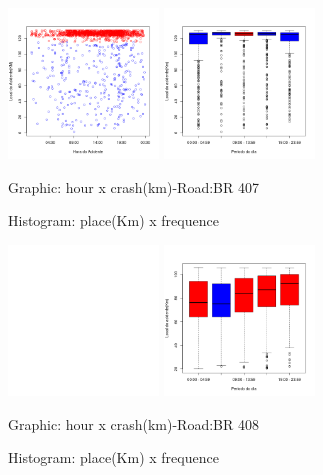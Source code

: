 \documentclass[conference,compsoc]{IEEEtran}
\begin{document}
\begin{figure}[ht]
\begin{center}
     \includegraphics[height=4.0cm]{graficos/br407_1.png}
     \includegraphics[height=4.0cm]{graficos/br407_2.png}
      \caption{Graphic: hour x crash(km)-Road:BR 407}
      \caption{Histogram: place(Km) x frequence}
\end{center}
\end{figure}

\begin{figure}[ht]
\begin{center}
     \includegraphics[height=4.0cm]{graficos/br408_1.png}
     \includegraphics[height=4.0cm]{graficos/br408_2.png}
      \caption{Graphic: hour x crash(km)-Road:BR 408}
      \caption{Histogram: place(Km) x frequence}
\end{center}
\end{figure}
\end{document}

